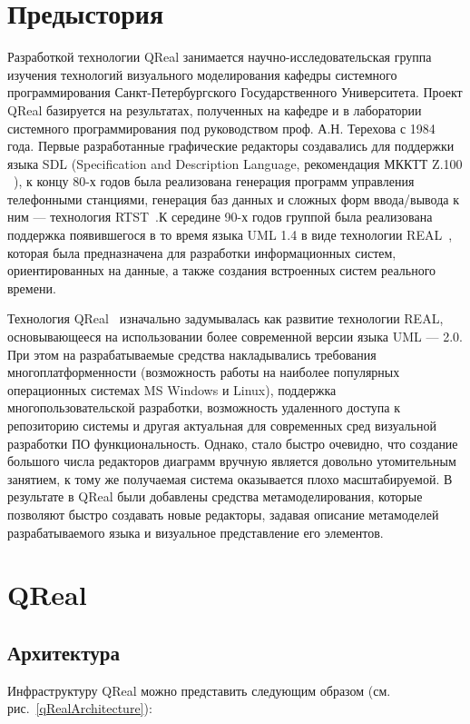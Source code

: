 \documentclass[a4paper]{article}
\begin{document}
\section{Предыстория}

Разработкой технологии QReal занимается научно-исследовательская группа изучения технологий визуального моделирования кафедры системного программирования Санкт-Петербургского Государственного Университета. Проект QReal базируется на результатах, полученных на кафедре и в лаборатории системного программирования под руководством проф. А.Н. Терехова с 1984 года. Первые разработанные графические редакторы создавались для поддержки языка SDL (Specification and Description Language, рекомендация МККТТ Z.100 ~\cite{sdl}), к концу 80-х годов была реализована генерация программ управления телефонными станциями, генерация баз данных и сложных форм ввода/вывода к ним — технология RTST~\cite{rtst}.К середине 90-х годов группой была реализована поддержка появившегося в то время языка UML 1.4 в виде технологии REAL~\cite{real}, которая была предназначена для разработки информационных систем, ориентированных на данные, а также создания встроенных систем реального времени. 

Технология QReal~\cite{qreal}  изначально задумывалась как развитие технологии REAL, основывающееся на использовании более современной версии языка UML --- 2.0. При этом на разрабатываемые средства накладывались требования многоплатформенности (возможность работы на наиболее популярных операционных системах MS Windows и Linux), поддержка многопользовательской разработки, возможность удаленного доступа к репозиторию системы и другая актуальная для современных сред визуальной разработки ПО функциональность. Однако, стало быстро очевидно, что создание большого числа редакторов диаграмм вручную является довольно утомительным занятием, к тому же получаемая система оказывается плохо масштабируемой. В результате в QReal были добавлены средства метамоделирования, которые позволяют быстро создавать новые редакторы, задавая описание метамоделей разрабатываемого языка и визуальное представление его элементов.

\section{QReal}

\subsection{Архитектура}
Инфраструктуру QReal можно представить следующим образом (см. рис.~\ref{qRealArchitecture}):
\end{document}
